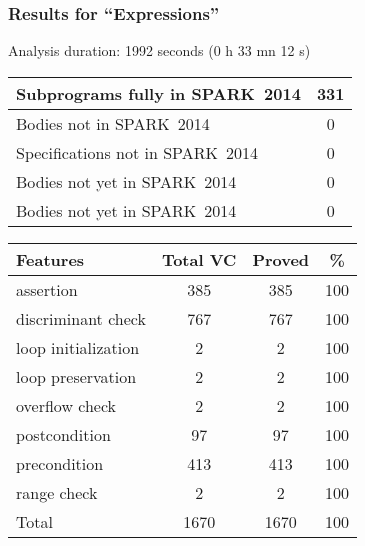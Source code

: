 \documentclass[10pt,a4paper,twocolumn]{article}
\newcommand{\newspark}{SPARK~2014\xspace}
\begin{document}
\subsubsection{Results for ``Expressions''}

Analysis duration: 1992 seconds (0 h 33 mn 12 s)

\vspace{5mm}

\begin{tabular}{|l|c|}
\hline
Subprograms fully in \newspark  &  331 \\
\hline
Bodies not in \newspark         &    0 \\
\hline
Specifications not in \newspark &    0 \\
\hline
Bodies not yet in \newspark     &    0 \\
\hline
Bodies not yet in \newspark     &    0 \\
\hline
\end{tabular}

\vspace{5mm}

\begin{tabular}{|l|c|c|c|}
\hline
Features             & Total VC & Proved & \%  \\ %
\hline
assertion            & 385      & 385    & 100 \\ %
\hline
discriminant check   & 767      & 767    & 100 \\ %
\hline
loop  initialization & 2        & 2      & 100 \\ %
\hline
loop preservation    & 2        & 2      & 100 \\ %
\hline
overflow check       & 2        & 2      & 100 \\ %
\hline
postcondition        & 97       & 97     & 100 \\ %
\hline
precondition         & 413      & 413    & 100 \\ %
\hline
range check          & 2        & 2      & 100 \\ %
\hline
Total                & 1670     & 1670   & 100 \\ %
\hline
\end{tabular}
\end{document}
